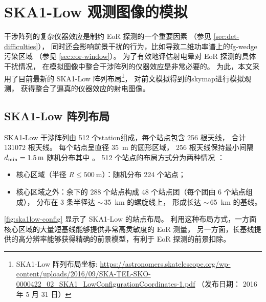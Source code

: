 \section{SKA1-Low 观测图像的模拟}
\label{sec:obs-simu}

干涉阵列的复杂仪器效应是制约 EoR 探测的一个重要因素
（参见 \autoref{sec:det-difficulties}），
同时还会影响前景干扰的行为，比如导致二维功率谱上的\ac{fg-wedge}污染区域
（参见 \autoref{sec:eor-window}）。
为了有效地评估射电晕对 EoR 探测的具体干扰情况，
在模拟图像中整合干涉阵列的仪器效应是非常必要的。
为此，本文采用了目前最新的 SKA1-Low 阵列布局\footnote{\raggedright%
  SKA1-Low 阵列布局坐标:
  \url{https://astronomers.skatelescope.org/wp-content/uploads/2016/09/SKA-TEL-SKO-0000422_02_SKA1_LowConfigurationCoordinates-1.pdf}
  （发布日期： 2016 年 5 月 31 日）}，
对前文模拟得到的\ac{skymap}进行模拟观测，
获得整合了逼真的仪器效应的射电图像。

\subsection{SKA1-Low 阵列布局}

SKA1-Low 干涉阵列由 512 个\ac{station}组成，每个站点包含 256 根天线，
合计 \num{131072} 根天线。
每个站点呈直径 \SI{35}{\meter} 的圆形区域，
256 根天线保持最小间隔 $d_{\mathrm{min}} = \SI{1.5}{\meter}$
随机分布其中 \cite{mort2017}。
512 个站点的布局方式分为两种情况 \cite{dewdney2016ska}：
\begin{itemize}
  \item 核心区域（半径 $R \le \SI{500}{\meter}$）：随机分布 224 个站点；
  \item 核心区域之外：余下的 288 个站点构成 48 个站点团（每个团由 6 个站点组成），
    分布在 3 条半径达 $\sim$\,\SI{35}{\km} 的螺旋线上，
    形成长达 $\sim$\,\SI{65}{\km} 的基线。
\end{itemize}
\autoref{fig:ska1low-config} 显示了 SKA1-Low 的站点布局。
利用这种布局方式，一方面核心区域的大量短基线能够提供非常高灵敏度的 EoR 测量，
另一方面，长基线提供的高分辨率能够获得精确的前景模型，有利于 EoR 探测的前景扣除。

